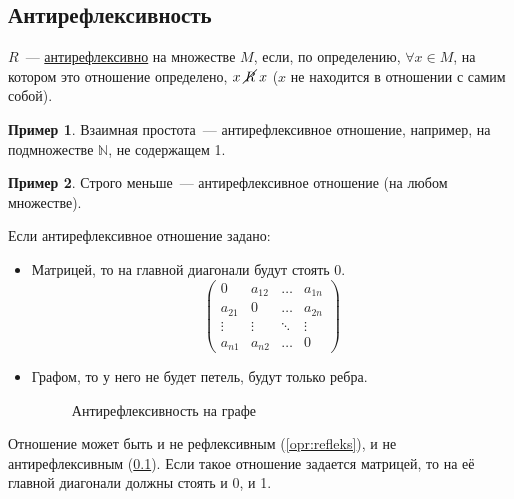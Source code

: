 \documentclass[russian]{lecture-notes}
\theoremstyle{definition}
\newtheorem{example*}{Пример}[subsection]
\newcommand{\UR}[2]{$#1\mathrel{\cancel{R}}#2$}
\begin{document}
\subsection{Антирефлексивность}
\label{opr:antirefleks}
\begin{definition}
	$R$~--- \underline{антирефлексивно} на множестве $M$, если, по определению, $\forall x \in M$, на котором это отношение определено, \UR{x}{x} ($x$ не находится в отношении с самим собой).
\end{definition}

\begin{example*}
	Взаимная простота~--- антирефлексивное отношение, например, на подмножестве $\mathbb{N}$, не содержащем 1.
\end{example*}

\begin{example*}
	Строго меньше~--- антирефлексивное отношение (на любом множестве).
\end{example*}

Если антирефлексивное отношение задано:
\begin{itemize}
	\item Матрицей, то на главной диагонали будут стоять 0.
	\begin{equation*}
	\left(
	\begin{array}{cccc}
	0 & a_{12} & \ldots & a_{1n}\\
	a_{21} & 0 & \ldots & a_{2n}\\
	\vdots & \vdots & \ddots & \vdots\\
	a_{n1} & a_{n2} & \ldots & 0
	\end{array}
	\right)
	\end{equation*}
	
	\item Графом, то у него не будет петель, будут только ребра.
	
	\begin{figure}[H]
		\centering
		\caption{\small Антирефлексивность на графе}
		\label{fig:antirefleks}
	\end{figure}
\end{itemize}

\begin{note}	
	Отношение может быть и не рефлексивным (\ref{opr:refleks}), и не антирефлексивным (\ref{opr:antirefleks}). Если такое отношение задается матрицей, то на её главной диагонали должны стоять и 0, и 1.
\end{note}
\end{document}
